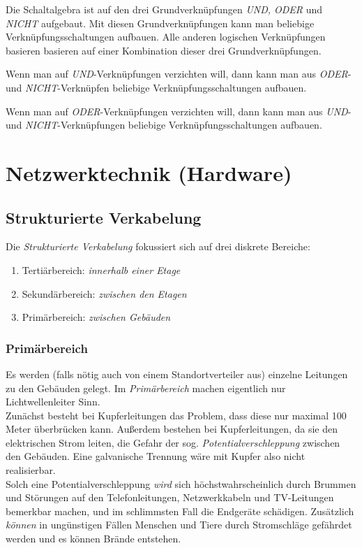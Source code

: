 \documentclass[a4paper, 12pt]{report}
\begin{document}
Die Schaltalgebra ist auf den drei Grundverknüpfungen \emph{UND, ODER} und
\emph{NICHT} aufgebaut. Mit diesen Grundverknüpfungen kann man beliebige
Verknüpfungsschaltungen aufbauen. Alle anderen logischen Verknüpfungen basieren
basieren auf einer Kombination dieser drei Grundverknüpfungen.

Wenn man auf \emph{UND}-Verknüpfungen verzichten will, dann kann man aus
\emph{ODER}- und \emph{NICHT}-Verknüpfen beliebige Verknüpfungsschaltungen
aufbauen.

Wenn man auf \emph{ODER}-Verknüpfungen verzichten will, dann kann man aus
\emph{UND}- und \emph{NICHT}-Verknüpfungen beliebige Verknüpfungsschaltungen
aufbauen.


\section{Netzwerktechnik (Hardware)}
\subsection{Strukturierte Verkabelung}

Die \emph{Strukturierte Verkabelung} fokussiert sich auf drei diskrete Bereiche:
\begin{enumerate}
    \item Tertiärbereich: \emph{innerhalb einer Etage}
    \item Sekundärbereich: \emph{zwischen den Etagen}
    \item Primärbereich: \emph{zwischen Gebäuden}
\end{enumerate}

\subsubsection{Primärbereich}
Es werden (falls nötig auch von einem Standortverteiler aus) einzelne Leitungen
zu den Gebäuden gelegt. Im \emph{Primärbereich} machen eigentlich nur
Lichtwellenleiter Sinn. \\

Zunächst besteht bei Kupferleitungen das Problem, dass diese nur maximal 100
Meter überbrücken kann. Außerdem bestehen bei Kupferleitungen, da sie den
elektrischen Strom leiten, die Gefahr der sog. \emph{Potentialverschleppung}
zwischen den Gebäuden. Eine galvanische Trennung wäre mit Kupfer also nicht
realisierbar. \\

Solch eine Potentialverschleppung \emph{wird} sich höchstwahrscheinlich durch
Brummen und Störungen auf den Telefonleitungen, Netzwerkkabeln und TV-Leitungen
bemerkbar machen, und im schlimmsten Fall die Endgeräte schädigen. Zusätzlich
\emph{können} in ungünstigen Fällen Menschen und Tiere durch Stromschläge
gefährdet werden und es können Brände entstehen. \\
\end{document}
